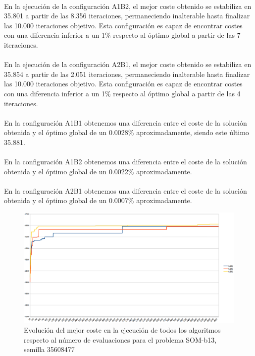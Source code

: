 	\paragraph{}En la ejecución de la configuración A1B2, el mejor coste obtenido se estabiliza en 35.801 a partir de las 8.356 iteraciones, permaneciendo inalterable hasta finalizar las 10.000 iteraciones objetivo. Esta configuración es capaz de encontrar costes con una diferencia inferior a un 1\% respecto al óptimo global a partir de las 7 iteraciones.
	
	\paragraph{}En la ejecución de la configuración A2B1, el mejor coste obtenido se estabiliza en 35.854 a partir de las 2.051 iteraciones, permaneciendo inalterable hasta finalizar las 10.000 iteraciones objetivo. Esta configuración es capaz de encontrar costes con una diferencia inferior a un 1\% respecto al óptimo global a partir de las 4 iteraciones.
	
	\paragraph{}En la configuración A1B1 obtenemos una diferencia entre el coste de la solución obtenida y el óptimo global de un 0.0028\% aproximadamente, siendo este último 35.881.
	
	\paragraph{}En la configuración A1B2 obtenemos una diferencia entre el coste de la solución obtenida y el óptimo global de un 0.0022\% aproximadamente.
	
	\paragraph{}En la configuración A2B1 obtenemos una diferencia entre el coste de la solución obtenida y el óptimo global de un 0.0007\% aproximadamente.

	\begin{figure}[H]
		\centering
		\includegraphics[scale=0.3]{img/SOM3conver.png}
		\caption{Evolución del mejor coste en la ejecución de todos los algoritmos respecto al número de evaluaciones para el problema SOM-b13, semilla 35608477}
		\label{SOM-b_13_historico}
	\end{figure}

